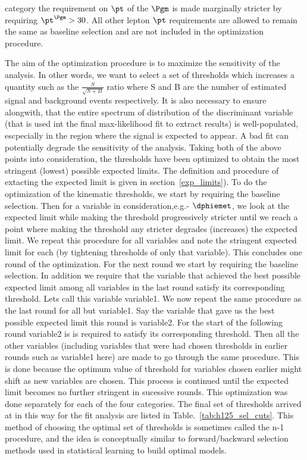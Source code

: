 category the requirement on $\pt$ of the $\Pgm$ is made marginally stricter by requiring  $\pt^{\Pgm} > 30$\GeV. All other lepton $\pt$ requirements are allowed to remain the same as baseline selection and are not included in the optimization procedure.   

The aim of the optimization procedure is to maximize the sensitivity of the analysis. In other words, we want to select a set of thresholds which increases a quantity such as the $\frac{S}{\sqrt{S+B}}$ ratio where S and B are the number of estimated signal and background events respectively. It is also necessary to ensure alongwith, that the entire spectrum of distribution of the discriminant variable (that is used int the final max-likelihood fit to extract results) is well-populated, escpecially in the region where the signal is expected to appear. A bad fit can potentially degrade the sensitivity of the analysis. Taking both of the above points into consideration, the thresholds have been optimized to obtain the most stringent (lowest) possible expected limits. The definition and procedure of extacting the expected limit is given in section~\ref{exp_limits}). To do the optimization of the kinematic thresholds, we start by requiring the baseline selection. Then for a variable in consideration,e.g.- $\dphiemet$, we look at the expected limit while making the threshold progressively stricter until we reach a point where making the threshold any stricter degrades (increases) the expected limit. We repeat this procedure for all variables and note the stringent expected limit for each (by tightening thresholds of only that variable). This concludes one round of the optimization. For the next round we start by requiring the baseline selection. In addition we require that the variable that achieved the best possible expected limit among all variables in the last round satisfy its corresponding threshold. Lets call this variable variable1. We now repeat the same procedure as the last round for all but variable1. Say the variable that gave us the best possible expected limit this round is variable2. For the start of the following round variable2 is is required to satisfy its corresponding threshold. Then all the other variables (including variables that were had chosen thresholds in earlier rounds such as variable1 here) are made to go through the same procedure. This is done because the optimum value of threshold for variables chosen earlier might shift as new variables are chosen. This process is continued until the expected limit becomes no further stringent in sucessive rounds. This optimization was done separately for each of the four categories. The final set of thresholds arrived at in this way for the \hmue \mcol fit analysis are listed in Table.~\ref{tab:h125_sel_cuts}. This method of choosing the optimal set of thresholds is sometimes called the n-1 procedure, and the idea is conceptually similar to forward/backward selection methods used in statistical learning to build optimal models.             


